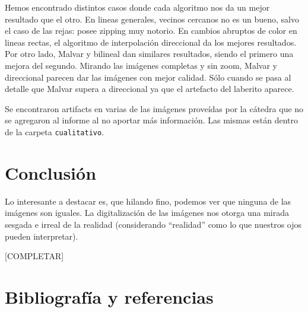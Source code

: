 \vspace{\baselineskip}

Hemos encontrado distintos casos donde cada algoritmo nos da un mejor resultado que el otro. En lineas generales, vecinos cercanos no es un bueno, salvo el caso de las rejas: posee zipping muy notorio. En cambios abruptos de color en lineas rectas, el algoritmo de interpolación direccional da los mejores resultados. Por otro lado, Malvar y bilineal dan similares resultados, siendo el primero una mejora del segundo. Mirando las imágenes completas y sin zoom, Malvar y direccional parecen dar las imágenes con mejor calidad. Sólo cuando se pasa al detalle que Malvar supera a direccional ya que el artefacto del laberito aparece.

Se encontraron artifacts en varias de las imágenes proveídas por la cátedra que no se agregaron al informe al no aportar más información. Las mismas están dentro de la carpeta \texttt{cualitativo}.


\newpage

\section{Conclusión}

Lo interesante a destacar es, que hilando fino, podemos ver que ninguna de las imágenes son iguales. La digitalización de las imágenes nos otorga una mirada sesgada e irreal de la realidad (considerando ``realidad'' como lo que nuestros ojos pueden interpretar).

[COMPLETAR]
\par
[COMPLETAR]
\par
[COMPLETAR]
\par
[COMPLETAR]

\newpage

\section{Bibliografía y referencias} 

